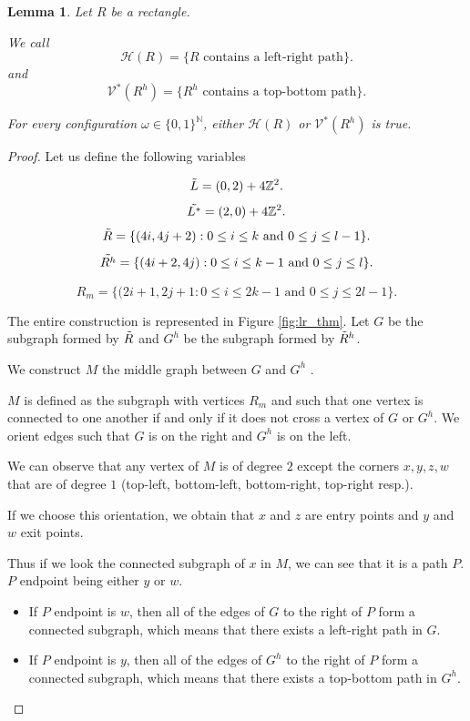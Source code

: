 \documentclass[a4paper,11pt]{article}
\theoremstyle{plain}
\newtheorem{lemma}[theorem]{Lemma}
\theoremstyle{definition}
\theoremstyle{remark}
\begin{document}
\begin{lemma}
\label{lr_tb_lemma}
Let $R$ be a rectangle.

We call 
\[\mathscr{H}(R) = \{R \text{ contains a left-right path}\}.\]
and
\[\mathscr{V^*}(R^h) = \{R^h \text{ contains a top-bottom path}\}.\] 

For every configuration $\omega \in \{ 0, 1 \}^\mathbb{N}$, either $\mathscr{H}(R)$ or $\mathscr{V^*}(R^h)$ is true.
\end{lemma}
\begin{proof}

Let us define the following variables

\[ \Tilde{L} = (0, 2) + 4 \mathbb{Z}^2. \]
\[ \Tilde{L^*} = (2, 0) + 4 \mathbb{Z}^2. \]
\[ \Tilde{R} = \{ (4i, 4j + 2) : 0 \leq i \leq k \text{ and } 0 \leq j \leq l - 1 \}. \]
\[ \Tilde{R^h} = \{ (4i + 2, 4j) : 0 \leq i \leq k - 1 \text{ and } 0 \leq j \leq l \}. \]

\[ R_{m} = \{ (2i + 1, 2j + 1 : 0 \leq i \leq 2k - 1 \text{ and } 0 \leq j \leq 2l - 1\}. \]

The entire construction is represented in Figure \ref{fig:lr_thm}.
Let $G$ be the subgraph formed by $\Tilde{R}$ and $G^h$ be the subgraph formed by $\Tilde{R}^h$.

We construct $M$ the middle graph between $G$ and $G^h$ .

$M$ is defined as the subgraph with vertices $R_{m}$ and such that one vertex is connected to one another if and only if it does not cross a vertex of $G$ or $G^h$. We orient edges such that $G$ is on the right and $G^h$ is on the left.

We can observe that any vertex of $M$ is of degree $2$ except the corners $x, y, z, w$ that are of degree $1$ (top-left, bottom-left, bottom-right, top-right resp.). 

If we choose this orientation, we obtain that $x$ and $z$ are entry points and $y$ and $w$ exit points.

Thus if we look the connected subgraph of $x$ in $M$, we can see that it is a path $P$. $P$ endpoint being either $y$ or $w$. 

\begin{itemize}
    \item If $P$ endpoint is $w$, then all of the edges of $G$ to the right of $P$ form a connected subgraph, which means that there exists a left-right path in $G$.
    \item If $P$ endpoint is $y$, then all of the edges of $G^h$ to the right of $P$ form a connected subgraph, which means that there exists a top-bottom path in $G^h$.
\end{itemize}


\end{proof}
\end{document}
